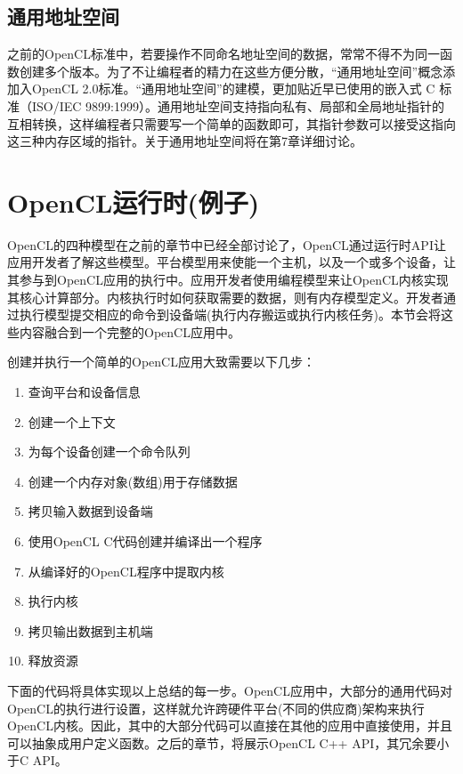 
\subsection{通用地址空间}

之前的OpenCL标准中，若要操作不同命名地址空间的数据，常常不得不为同一函数创建多个版本。为了不让编程者的精力在这些方便分散，“通用地址空间”概念添加入OpenCL 2.0标准。“通用地址空间”的建模，更加贴近早已使用的嵌入式 C 标准（ISO/IEC 9899:1999）。通用地址空间支持指向私有、局部和全局地址指针的互相转换，这样编程者只需要写一个简单的函数即可，其指针参数可以接受这指向这三种内存区域的指针。关于通用地址空间将在第7章详细讨论。



\section{OpenCL运行时(例子)}

OpenCL的四种模型在之前的章节中已经全部讨论了，OpenCL通过运行时API让应用开发者了解这些模型。平台模型用来使能一个主机，以及一个或多个设备，让其参与到OpenCL应用的执行中。应用开发者使用编程模型来让OpenCL内核实现其核心计算部分。内核执行时如何获取需要的数据，则有内存模型定义。开发者通过执行模型提交相应的命令到设备端(执行内存搬运或执行内核任务)。本节会将这些内容融合到一个完整的OpenCL应用中。

创建并执行一个简单的OpenCL应用大致需要以下几步：

\begin{enumerate}
\item 查询平台和设备信息
\item 创建一个上下文
\item 为每个设备创建一个命令队列
\item 创建一个内存对象(数组)用于存储数据
\item 拷贝输入数据到设备端
\item 使用OpenCL C代码创建并编译出一个程序
\item 从编译好的OpenCL程序中提取内核
\item 执行内核
\item 拷贝输出数据到主机端
\item 释放资源
\end{enumerate}

下面的代码将具体实现以上总结的每一步。OpenCL应用中，大部分的通用代码对OpenCL的执行进行设置，这样就允许跨硬件平台(不同的供应商)架构来执行OpenCL内核。因此，其中的大部分代码可以直接在其他的应用中直接使用，并且可以抽象成用户定义函数。之后的章节，将展示OpenCL C++ API，其冗余要小于C API。


